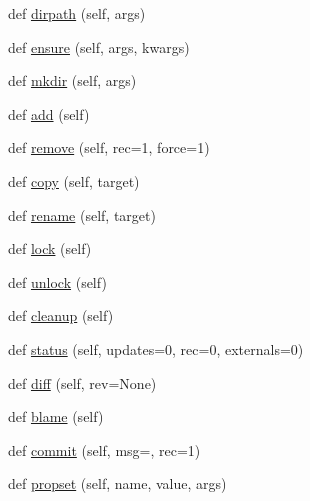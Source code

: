 \begin{DoxyCompactItemize}
\item 
def \hyperlink{classpy_1_1__path_1_1svnwc_1_1_svn_w_c_command_path_a3055d71d6a893eb1324f47be47e72847}{dirpath} (self, args)
\item 
def \hyperlink{classpy_1_1__path_1_1svnwc_1_1_svn_w_c_command_path_a32286b291c26946ac3f6d6bbf001685d}{ensure} (self, args, kwargs)
\item 
def \hyperlink{classpy_1_1__path_1_1svnwc_1_1_svn_w_c_command_path_ac684853e7d9dae0a9e0781464c64f938}{mkdir} (self, args)
\item 
def \hyperlink{classpy_1_1__path_1_1svnwc_1_1_svn_w_c_command_path_a943b2eafd3d9f521f8965dc5b066b8d9}{add} (self)
\item 
def \hyperlink{classpy_1_1__path_1_1svnwc_1_1_svn_w_c_command_path_a6284a7e36081f029a2ddd256abcf0b82}{remove} (self, rec=1, force=1)
\item 
def \hyperlink{classpy_1_1__path_1_1svnwc_1_1_svn_w_c_command_path_af235d1376cdca1e9e38f6d68b7f49ae4}{copy} (self, target)
\item 
def \hyperlink{classpy_1_1__path_1_1svnwc_1_1_svn_w_c_command_path_abe931c4f4010d71481387d6738ec19c0}{rename} (self, target)
\item 
def \hyperlink{classpy_1_1__path_1_1svnwc_1_1_svn_w_c_command_path_a92949f6ea9e4dfbf5110454debc1918d}{lock} (self)
\item 
def \hyperlink{classpy_1_1__path_1_1svnwc_1_1_svn_w_c_command_path_a89f9ec2613c5cb1aba6ac62f1fe021d0}{unlock} (self)
\item 
def \hyperlink{classpy_1_1__path_1_1svnwc_1_1_svn_w_c_command_path_a6d67131ab38499422e4ab9053a4098bd}{cleanup} (self)
\item 
def \hyperlink{classpy_1_1__path_1_1svnwc_1_1_svn_w_c_command_path_a904342dc428d4304962544061cf44473}{status} (self, updates=0, rec=0, externals=0)
\item 
def \hyperlink{classpy_1_1__path_1_1svnwc_1_1_svn_w_c_command_path_a50804ebe76d4abf5235c164b8e377f71}{diff} (self, rev=None)
\item 
def \hyperlink{classpy_1_1__path_1_1svnwc_1_1_svn_w_c_command_path_a2e91cc705fae01b9e52aa2e323471513}{blame} (self)
\item 
def \hyperlink{classpy_1_1__path_1_1svnwc_1_1_svn_w_c_command_path_a2c7692b1c629506fd7f7dd2f82b520d2}{commit} (self, msg=\textquotesingle{}\textquotesingle{}, rec=1)
\item 
def \hyperlink{classpy_1_1__path_1_1svnwc_1_1_svn_w_c_command_path_a31a352044c5007ca2ad5414774498296}{propset} (self, name, value, args)

\end{DoxyCompactItemize}
